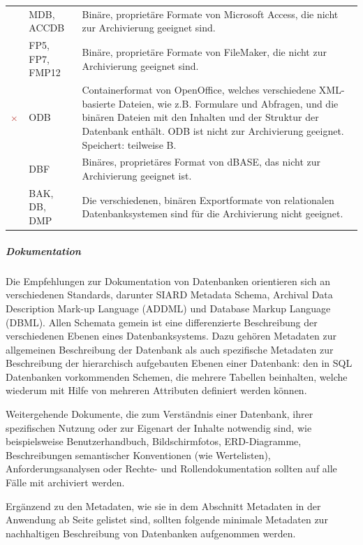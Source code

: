 \begin{center}
\begin{longtable}{l L{0.2\textwidth} p{0.6\textwidth}}
		& MDB, ACCDB & Binäre, proprietäre Formate von Microsoft Access, die nicht zur Archivierung geeignet sind.\\
		& FP5, FP7, FMP12 & Binäre, proprietäre Formate von FileMaker, die nicht zur Archivierung geeignet sind.\\
		& ODB & Containerformat von OpenOffice, welches verschiedene XML-basierte Dateien, wie z.B. Formulare und Abfragen, und die binären Dateien mit den Inhalten und der Struktur der Datenbank enthält. ODB ist nicht zur Archivierung geeignet. Speichert: teilweise B.\\
		& DBF & Binäres, proprietäres Format von dBASE, das nicht zur Archivierung geeignet ist.\\
		& BAK, DB, DMP & Die verschiedenen, binären Exportformate von relationalen Datenbanksystemen sind für die Archivierung nicht geeignet.\\
		\bottomrule    
	\end{longtable}
\end{center}


\subparagraph{Dokumentation}
Die Empfehlungen zur Dokumentation von Datenbanken orientieren sich an verschiedenen Standards, darunter SIARD Metadata Schema, Archival Data Description Mark-up Language (ADDML) und Database Markup Language (DBML). Allen Schemata gemein ist eine differenzierte Beschreibung der verschiedenen Ebenen eines Datenbanksystems. Dazu gehören Metadaten zur allgemeinen Beschreibung der Datenbank als auch spezifische Metadaten zur Beschreibung der hierarchisch aufgebauten Ebenen einer Datenbank: den in SQL Datenbanken vorkommenden Schemen, die mehrere Tabellen beinhalten, welche wiederum mit Hilfe von mehreren Attributen definiert werden können. 

Weitergehende Dokumente, die zum Verständnis einer Datenbank, ihrer spezifischen Nutzung oder zur Eigenart der Inhalte notwendig sind, wie beispielsweise Benutzerhandbuch, Bildschirmfotos, ERD-Diagramme, Beschreibungen semantischer Konventionen (wie Wertelisten), Anforderungsanalysen oder Rechte- und Rollendokumentation sollten auf alle Fälle mit archiviert werden.

Ergänzend zu den Metadaten, wie sie in dem Abschnitt Metadaten in der Anwendung ab Seite \pageref{Metadaten-anwendung} gelistet sind, sollten folgende minimale Metadaten zur nachhaltigen Beschreibung von Datenbanken aufgenommen werden.

